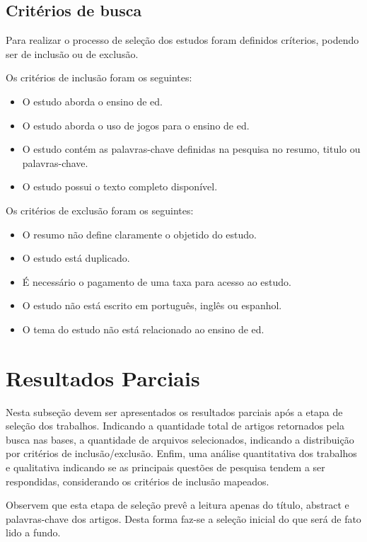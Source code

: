 \documentclass[12pt]{article}
\begin{document}
\subsection{Critérios de busca}

Para realizar o processo de seleção dos estudos foram definidos críterios, podendo ser de inclusão ou de exclusão.

Os critérios de inclusão foram os seguintes:
\begin{itemize}
    \item O estudo aborda o ensino de \gls{ed}.
    \item O estudo aborda o uso de jogos para o ensino de \gls{ed}.
    \item O estudo contém as palavras-chave definidas na pesquisa no resumo, titulo ou palavras-chave.
    \item O estudo possui o texto completo disponível.
\end{itemize}
Os critérios de exclusão foram os seguintes:
\begin{itemize}
    \item O resumo não define claramente o objetido do estudo.
    \item O estudo está duplicado.
    \item É necessário o pagamento de uma taxa para acesso ao estudo.
    \item O estudo não está escrito em português, inglês ou espanhol.
    \item O tema do estudo não está relacionado ao ensino de \gls{ed}.
\end{itemize}

\section{Resultados Parciais}

Nesta subseção devem ser apresentados os resultados parciais após a etapa de seleção dos trabalhos. Indicando a quantidade total de artigos retornados pela busca nas bases, a quantidade de arquivos selecionados, indicando a distribuição por critérios de inclusão/exclusão. Enfim, uma análise quantitativa dos trabalhos e qualitativa indicando se as principais questões de pesquisa tendem a ser respondidas, considerando os critérios de inclusão mapeados.

Observem que esta etapa de seleção prevê a leitura apenas do título, abstract e palavras-chave dos artigos. Desta forma faz-se a seleção inicial do que será de fato lido a fundo.
\end{document}
